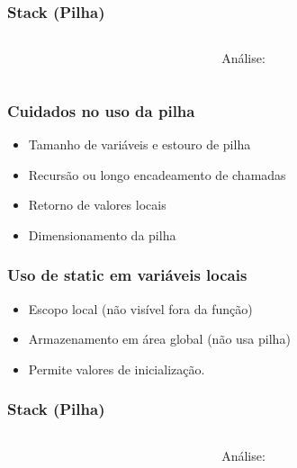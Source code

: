 \documentclass{beamer}
\begin{document}
\begin{frame}
	\frametitle{Stack (Pilha)}
	\begin{columns}[T] %
	\begin{column}{.60\textwidth}
		
	\end{column}%
	\hfill%
	\begin{column}{.40\textwidth}
		Análise:
	\end{column}%
\end{columns}	
\end{frame}

\begin{frame}
	\frametitle{Cuidados no uso da pilha}
	\begin{itemize}
	\item Tamanho de variáveis e estouro de pilha
	\item Recursão ou longo encadeamento de chamadas
	\item Retorno de valores locais
	\item Dimensionamento da pilha
	\end{itemize}	
\end{frame}

\begin{frame}
	\frametitle{Uso de static em variáveis locais}
	\begin{itemize}
	\item Escopo local (não visível fora da função)
	\item Armazenamento em área global (não usa pilha)
	\item Permite valores de inicialização.
	\end{itemize}	
\end{frame}

\begin{frame}
	\frametitle{Stack (Pilha)}
	\begin{columns}[T] %
		\begin{column}{.60\textwidth}
			
		\end{column}%
		\hfill%
		\begin{column}{.40\textwidth}
			Análise:
		\end{column}%
	\end{columns}	
\end{frame}
\end{document}
